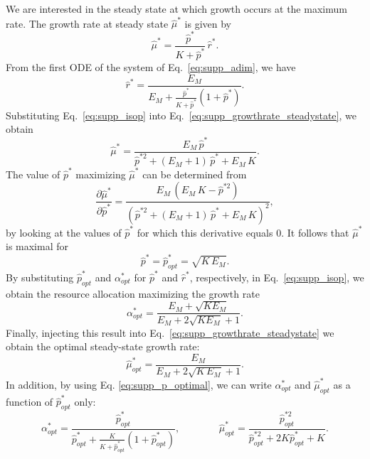 We are interested in the steady state at which growth occurs at the maximum rate.
The growth rate at steady state $\hat{\mu}^*$ is given by
\begin{equation}
\label{eq:supp_growthrate_steadystate}
\hat{\mu}^* = \frac{\hat{p}^*}{K + \hat{p}^*} \, \hat{r}^* .
\end{equation}
From the first ODE of the system of Eq.~\ref{eq:supp_adim}, we have
\begin{equation}
\label{eq:supp_isop}
\hat{r}^* = \frac{E_M}{E_M + \frac{\hat{p}^*}{K + \hat{p}^*} (1+\hat{p}^*)} .
\end{equation}
Substituting Eq.~\ref{eq:supp_isop} into Eq.~\ref{eq:supp_growthrate_steadystate}, we obtain
\begin{equation}
\label{eq:supp_growthrate_steadystate_p}
\hat{\mu}^* = \frac{E_M \, \hat{p}^*}{\hat{p}^{* 2} + (E_M + 1)\, \hat{p}^* + E_M\, K} .
\end{equation}
The value of $\hat{p}^*$ maximizing $\hat{\mu}^*$ can be determined from
\begin{equation}
\label{eq:supp_growthrate_steadystate_deriv_p}
\frac{\partial\hat{\mu}^*}{\partial\hat{p}^*} = \frac{E_M \, (E_M\, K - \hat{p}^{*2})}{\left(\hat{p}^{* 2} + (E_M + 1)\, \hat{p}^* + E_M\, K\right)^2},
\end{equation}
by looking at the values of $\hat{p}^*$ for which this derivative equals 0.
It follows that $\hat{\mu}^*$ is maximal for
\begin{equation}
\label{eq:supp_p_optimal}
\hat{p}^* = \hat{p}^*_{opt} = \sqrt{K\, E_M}.
\end{equation}
By substituting $\hat{p}^*_{opt}$ and $\alpha_{opt}^*$ for $\hat{p}^*$ and $\hat{r}^*$, respectively, in Eq.~\ref{eq:supp_isop}, we obtain the resource allocation maximizing the growth rate
\begin{equation}
\label{eq:supp_alpha_optimal}
\alpha_{opt}^* = \frac{E_M + \sqrt{KE_M}}{E_M + 2\sqrt{KE_M} + 1}.
\end{equation}
Finally, injecting this result into Eq.~\ref{eq:supp_growthrate_steadystate} we obtain the optimal steady-state growth rate:
\begin{equation}
\label{eq:supp_growthrate_optimal}
\hat{\mu}^*_{opt} = \frac{E_M}{E_M + 2\sqrt{K\, E_M} + 1}.
\end{equation}
In addition, by using Eq. \ref{eq:supp_p_optimal}, we can write $\alpha_{opt}^*$ and $\hat{\mu}_{opt}^*$ as a function of $\hat{p}_{opt}^*$ only:
\begin{equation}
\label{eq:supp_alpha_mu_optimal_p}
\alpha_{opt}^* = \frac{\hat{p}^{*}_{opt}}{\hat{p}^{*}_{opt} + \frac{K}{K+\hat{p}^{*}_{opt}}(1+\hat{p}^{*}_{opt})}
, \;\;\;\;\;\;\;\;\;\;\;\;\;\; 
\hat{\mu}^*_{opt} = \frac{\hat{p}^{* 2}_{opt}}{\hat{p}^{* 2}_{opt} + 2K\hat{p}^*_{opt} + K}.
\end{equation}

